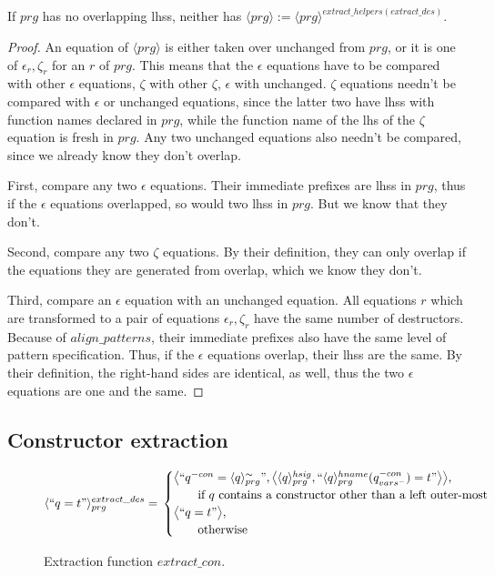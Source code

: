 \begin{lemma}

If $prg$ has no overlapping lhss, neither has $\langle prg \rangle := \langle prg \rangle^{extract\_helpers(extract\_des)}$.

\begin{proof}

An equation of $\langle prg \rangle$ is either taken over unchanged from $prg$, or it is one of $\epsilon_r, \zeta_r$ for an $r$ of $prg$. This means that the $\epsilon$ equations have to be compared with other $\epsilon$ equations, $\zeta$ with other $\zeta$, $\epsilon$ with unchanged. $\zeta$ equations needn't be compared with $\epsilon$ or unchanged equations, since the latter two have lhss with function names declared in $prg$, while the function name of the lhs of the $\zeta$ equation is fresh in $prg$. Any two unchanged equations also needn't be compared, since we already know they don't overlap.

First, compare any two $\epsilon$ equations. Their immediate prefixes are lhss in $prg$, thus if the $\epsilon$ equations overlapped, so would two lhss in $prg$. But we know that they don't.

Second, compare any two $\zeta$ equations. By their definition, they can only overlap if the equations they are generated from overlap, which we know they don't.

Third, compare an $\epsilon$ equation with an unchanged equation. All equations $r$ which are transformed to a pair of equations $\epsilon_r, \zeta_r$ have the same number of destructors. Because of $align\_patterns$, their immediate prefixes also have the same level of pattern specification. Thus, if the $\epsilon$ equations overlap, their lhss are the same. By their definition, the right-hand sides are identical, as well, thus the two $\epsilon$ equations are one and the same.

\end{proof}

\end{lemma}

\subsection{Constructor extraction}

\begin{figure}
\vspace{2.4in}
\[
    \langle `` q = t " \rangle^{extract\_des}_{prg} =\\
\begin{cases}
    \big\langle `` q^{-con} =  \langle q \rangle^{\sim}_{prg} ", \big\langle \langle q \rangle^{hsig}_{prg}, `` \langle q \rangle^{hname}_{prg}(q^{-con}_{vars^-}) = t  " \big\rangle \big\rangle,& \\
   \qquad \text{if $q$ contains a constructor other than a left outer-most} \\
   \big\langle `` q = t " \big\rangle,& \\
   \qquad \text{otherwise}
\end{cases}
\]
\caption{Extraction function $extract\_con$.}
\end{figure}

